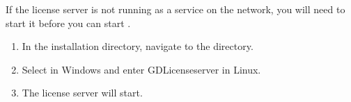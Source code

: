 If the license server  is not running as a service on the network, you will need to start it before you can start \jb{}. 

\begin{enumerate}
\item In the \jb{} installation directory, navigate to the  directory.
\item Select  in Windows and enter GDLicenseserver in Linux. 
\item The license server will start. 
\end{enumerate}
